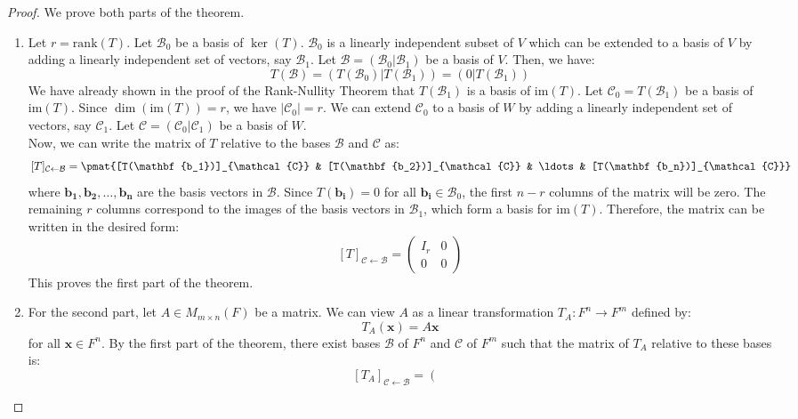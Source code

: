 \documentclass[openany]{book}
\begin{document}
\begin{proof}
    We prove both parts of the theorem. \\
    \begin{enumerate}
    \item Let $r = \text{rank}(T)$. Let $\mathcal{B}_0$ be a basis of $\ker(T)$. $\mathcal{B}_0$ is a linearly independent subset of $V$ which can be extended to a basis of $V$ by adding a linearly independent set of vectors, say $\mathcal{B}_1$. Let $\mathcal{B} = (\mathcal{B}_0 | \mathcal{B}_1)$ be a basis of $V$. Then, we have:
    $$T(\mathcal{B}) = (T(\mathcal{B}_0) | T(\mathcal{B}_1)) = (0 | T(\mathcal{B}_1))$$
    We have already shown in the proof of the Rank-Nullity Theorem that $T(\mathcal{B}_1)$ is a basis of $\text{im}(T)$. Let $\mathcal{C}_0 = T(\mathcal{B}_1)$ be a basis of $\text{im}(T)$. Since $\dim(\text{im}(T)) = r$, we have $|\mathcal{C}_0| = r$. We can extend $\mathcal{C}_0$ to a basis of $W$ by adding a linearly independent set of vectors, say $\mathcal{C}_1$. Let $\mathcal{C} = (\mathcal{C}_0 | \mathcal{C}_1)$ be a basis of $W$. \\
    Now, we can write the matrix of $T$ relative to the bases $\mathcal{B}$ and $\mathcal{C}$ as:
    $$[T]_{\mathcal{C} \leftarrow \mathcal{B}} = \pmat{[T(\mathbf{b_1})]_{\mathcal{C}} & [T(\mathbf{b_2})]_{\mathcal{C}} & \ldots & [T(\mathbf{b_n})]_{\mathcal{C}}}$$
    where $\mathbf{b_1}, \mathbf{b_2}, \ldots, \mathbf{b_n}$ are the basis vectors in $\mathcal{B}$. Since $T(\mathbf{b_i}) = 0$ for all $\mathbf{b_i} \in \mathcal{B}_0$, the first $n - r$ columns of the matrix will be zero. The remaining $r$ columns correspond to the images of the basis vectors in $\mathcal{B}_1$, which form a basis for $\text{im}(T)$. Therefore, the matrix can be written in the desired form:
    $$[T]_{\mathcal{C} \leftarrow \mathcal{B}} = \left(\begin{array}{c|c}
    I_r & 0 \\
    \hline
    0 & 0
    \end{array} \right)$$
    This proves the first part of the theorem.
    \item For the second part, let $A \in M_{m \times n}(F)$ be a matrix. We can view $A$ as a linear transformation $T_A: F^n \to F^m$ defined by:
    $$T_A(\mathbf{x}) = A\mathbf{x}$$
    for all $\mathbf{x} \in F^n$. By the first part of the theorem, there exist bases $\mathcal{B}$ of $F^n$ and $\mathcal{C}$ of $F^m$ such that the matrix of $T_A$ relative to these bases is:
    $$[T_A]_{\mathcal{C} \leftarrow \mathcal{B}} = \left(\begin{array}{c|c}

\end{array}$$
\end{enumerate}
\end{proof}
\end{document}
